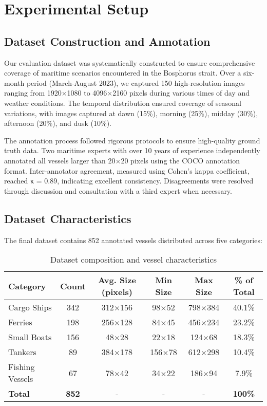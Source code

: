 \documentclass[10pt]{article}
\begin{document}
\section{Experimental Setup}

\subsection{Dataset Construction and Annotation}

Our evaluation dataset was systematically constructed to ensure comprehensive coverage of maritime scenarios encountered in the Bosphorus strait. Over a six-month period (March-August 2023), we captured 150 high-resolution images ranging from 1920×1080 to 4096×2160 pixels during various times of day and weather conditions. The temporal distribution ensured coverage of seasonal variations, with images captured at dawn (15\%), morning (25\%), midday (30\%), afternoon (20\%), and dusk (10\%).

The annotation process followed rigorous protocols to ensure high-quality ground truth data. Two maritime experts with over 10 years of experience independently annotated all vessels larger than 20×20 pixels using the COCO annotation format. Inter-annotator agreement, measured using Cohen's kappa coefficient, reached κ = 0.89, indicating excellent consistency. Disagreements were resolved through discussion and consultation with a third expert when necessary.

\subsection{Dataset Characteristics}

The final dataset contains 852 annotated vessels distributed across five categories:

\begin{table}[ht]
\centering
\caption{Dataset composition and vessel characteristics}
\label{tab:dataset}
\begin{tabular}{lccccc}
\toprule
Category & Count & Avg. Size (pixels) & Min Size & Max Size & \% of Total \\
\midrule
Cargo Ships & 342 & 312×156 & 98×52 & 798×384 & 40.1\% \\
Ferries & 198 & 256×128 & 84×45 & 456×234 & 23.2\% \\
Small Boats & 156 & 48×28 & 22×18 & 124×68 & 18.3\% \\
Tankers & 89 & 384×178 & 156×78 & 612×298 & 10.4\% \\
Fishing Vessels & 67 & 78×42 & 34×22 & 186×94 & 7.9\% \\
\midrule
\textbf{Total} & \textbf{852} & - & - & - & \textbf{100\%} \\
\bottomrule
\end{tabular}
\end{table}
\end{document}
